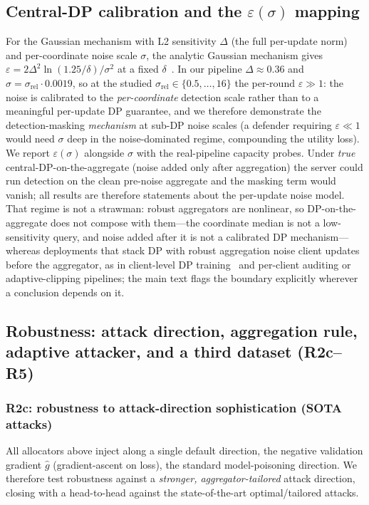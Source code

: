 \documentclass[final,1p,times]{elsarticle}
\begin{document}
\subsection{Central-DP calibration and the $\varepsilon(\sigma)$ mapping}\label{supp:eps}
For the Gaussian mechanism with L2 sensitivity $\Delta$ (the full
per-update norm) and per-coordinate noise scale $\sigma$, the analytic
Gaussian mechanism gives $\varepsilon = 2\Delta^2\ln(1.25/\delta)/\sigma^2$
at a fixed $\delta$~\cite{dwork2006calibrating}. In our pipeline
$\Delta\approx0.36$ and $\sigma=\sigma_{\mathrm{rel}}\cdot0.0019$, so at
the studied $\sigma_{\mathrm{rel}}\in\{0.5,\dots,16\}$ the per-round
$\varepsilon\gg1$: the noise is calibrated to the \emph{per-coordinate}
detection scale rather than to a meaningful per-update DP guarantee, and
we therefore demonstrate the detection-masking \emph{mechanism} at sub-DP
noise scales (a defender requiring $\varepsilon\ll1$ would need $\sigma$
deep in the noise-dominated regime, compounding the utility loss). We
report $\varepsilon(\sigma)$ alongside $\sigma$ with the real-pipeline
capacity probes. Under \emph{true} central-DP-on-the-aggregate (noise
added only after aggregation) the server could run detection on the clean
pre-noise aggregate and the masking term would vanish; all results are
therefore statements about the per-update noise model. That regime is not
a strawman: robust aggregators are nonlinear, so DP-on-the-aggregate does
not compose with them---the coordinate median is not a low-sensitivity
query, and noise added after it is not a calibrated DP
mechanism---whereas deployments that stack DP with robust aggregation
noise client updates before the aggregator, as in client-level DP
training~\cite{mcmahan2018dp} and per-client auditing or adaptive-clipping
pipelines; the main text flags the boundary explicitly wherever a
conclusion depends on it.

\subsection{Robustness: attack direction, aggregation rule, adaptive
attacker, and a third dataset (R2c--R5)}\label{sec:robust}
\subsubsection{R2c: robustness to attack-direction sophistication (SOTA attacks)}
\label{sec:r2c}
All allocators above inject along a single default direction, the
negative validation gradient $\hat g$ (gradient-ascent on loss), the
standard model-poisoning direction. We therefore test robustness against a
\emph{stronger, aggregator-tailored} attack direction, closing with a
head-to-head against the state-of-the-art optimal/tailored attacks.
\end{document}
